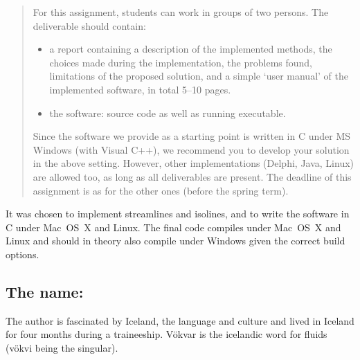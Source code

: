 \begin{quote}
For this assignment, students can work in groups of two persons. The
deliverable should contain: 

\begin{itemize}
  
  \item a report containing a description of the implemented methods, the
  choices made during the implementation, the problems found, limitations of
  the proposed solution, and a simple `user manual' of the implemented
  software, in total 5--10 pages. 

  \item the software: source code as well as running executable. 

\end{itemize}

Since the software we provide as a starting point is written in C under MS
Windows (with Visual C++), we recommend you to develop your solution in the
above setting. However, other implementations (Delphi, Java, Linux) are allowed
too, as long as all deliverables are present. The deadline of this assignment
is as for the other ones (before the spring term).

\end{quote}

It was chosen to implement streamlines and isolines, and to write the software
in C under Mac~OS~X and Linux. The final code compiles under Mac~OS~X and Linux
and should in theory also compile under Windows given the correct build options.

\subsection{The name: \fluids{}}

The author is fascinated by Iceland, the language and culture and lived in
Iceland for four months during a traineeship. V\"okvar is the icelandic word
for fluids (v\"okvi being the singular).

